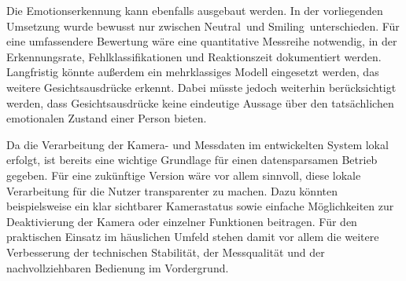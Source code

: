 Die Emotionserkennung kann ebenfalls ausgebaut werden. In der vorliegenden Umsetzung wurde bewusst nur zwischen \glqq Neutral\grqq\ und \glqq Smiling\grqq\ unterschieden. Für eine umfassendere Bewertung wäre eine quantitative Messreihe notwendig, in der Erkennungsrate, Fehlklassifikationen und Reaktionszeit dokumentiert werden. Langfristig könnte außerdem ein mehrklassiges Modell eingesetzt werden, das weitere Gesichtsausdrücke erkennt. Dabei müsste jedoch weiterhin berücksichtigt werden, dass Gesichtsausdrücke keine eindeutige Aussage über den tatsächlichen emotionalen Zustand einer Person bieten.

Da die Verarbeitung der Kamera- und Messdaten im entwickelten System lokal erfolgt, ist bereits eine wichtige Grundlage für einen datensparsamen Betrieb gegeben. Für eine zukünftige Version wäre vor allem sinnvoll, diese lokale Verarbeitung für die Nutzer transparenter zu machen. Dazu könnten beispielsweise ein klar sichtbarer Kamerastatus sowie einfache Möglichkeiten zur Deaktivierung der Kamera oder einzelner Funktionen beitragen. Für den praktischen Einsatz im häuslichen Umfeld stehen damit vor allem die weitere Verbesserung der technischen Stabilität, der Messqualität und der nachvollziehbaren Bedienung im Vordergrund.
